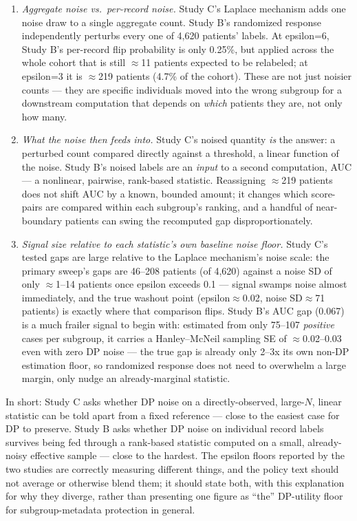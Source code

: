 \documentclass[11pt]{article}
\begin{document}
\begin{enumerate}
\item \emph{Aggregate noise vs.\ per-record noise.} Study C's Laplace mechanism adds one noise draw to a single aggregate count. Study B's randomized response independently perturbs every one of 4{,}620 patients' labels. At epsilon=6, Study B's per-record flip probability is only 0.25\%, but applied across the whole cohort that is still $\approx$11 patients expected to be relabeled; at epsilon=3 it is $\approx$219 patients (4.7\% of the cohort). These are not just noisier counts --- they are specific individuals moved into the wrong subgroup for a downstream computation that depends on \emph{which} patients they are, not only how many.
\item \emph{What the noise then feeds into.} Study C's noised quantity \emph{is} the answer: a perturbed count compared directly against a threshold, a linear function of the noise. Study B's noised labels are an \emph{input} to a second computation, AUC --- a nonlinear, pairwise, rank-based statistic. Reassigning $\approx$219 patients does not shift AUC by a known, bounded amount; it changes which score-pairs are compared within each subgroup's ranking, and a handful of near-boundary patients can swing the recomputed gap disproportionately.
\item \emph{Signal size relative to each statistic's own baseline noise floor.} Study C's tested gaps are large relative to the Laplace mechanism's noise scale: the primary sweep's gaps are 46--208 patients (of 4{,}620) against a noise SD of only $\approx$1--14 patients once epsilon exceeds 0.1 --- signal swamps noise almost immediately, and the true washout point (epsilon$\approx$0.02, noise SD$\approx$71 patients) is exactly where that comparison flips. Study B's AUC gap (0.067) is a much frailer signal to begin with: estimated from only 75--107 \emph{positive} cases per subgroup, it carries a Hanley--McNeil sampling SE of $\approx$0.02--0.03 even with zero DP noise --- the true gap is already only 2--3x its own non-DP estimation floor, so randomized response does not need to overwhelm a large margin, only nudge an already-marginal statistic.
\end{enumerate}

In short: Study C asks whether DP noise on a directly-observed, large-$N$, linear statistic can be told apart from a fixed reference --- close to the easiest case for DP to preserve. Study B asks whether DP noise on individual record labels survives being fed through a rank-based statistic computed on a small, already-noisy effective sample --- close to the hardest. The epsilon floors reported by the two studies are correctly measuring different things, and the policy text should not average or otherwise blend them; it should state both, with this explanation for why they diverge, rather than presenting one figure as ``the'' DP-utility floor for subgroup-metadata protection in general.
\end{document}
